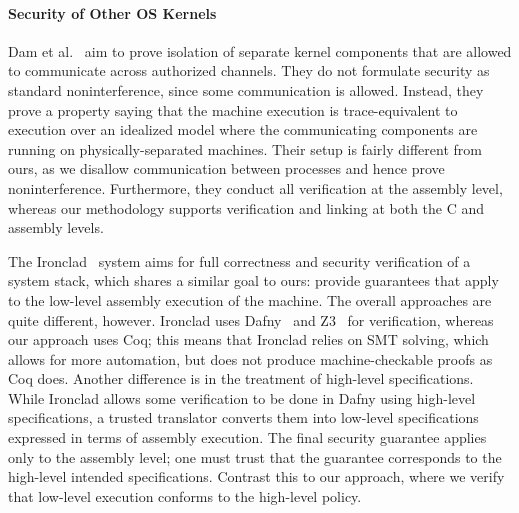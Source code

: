 
%

\paragraph{Security of Other OS Kernels} Dam et al.~\cite{prosper-arm} aim to 
prove isolation of separate kernel components that are allowed to communicate
across authorized channels. They do not formulate security as standard
noninterference, since some communication is allowed. Instead, they
prove a property saying that the machine execution is trace-equivalent
to execution over an idealized model where the communicating
components are running on physically-separated machines. Their setup
is fairly different from ours, as we disallow communication between
processes and hence prove noninterference. Furthermore, they conduct
all verification at the assembly level, whereas our methodology
supports verification and linking at both the C and assembly levels.

The Ironclad~\cite{ironclad} system aims for full correctness and
security verification of a system stack, which shares a similar
goal to ours: provide guarantees that apply to the low-level assembly
execution of the machine. The overall approaches are quite different,
however. Ironclad uses Dafny~\cite{dafny} and Z3~\cite{z3} for
verification, whereas our approach uses Coq; this means that Ironclad
relies on SMT solving, which allows for more automation, but does not
produce machine-checkable proofs as Coq does. 
Another difference is in the treatment
of high-level specifications. While Ironclad allows some verification
to be done in Dafny using high-level specifications, a trusted
translator converts them into low-level specifications expressed in
terms of assembly execution. The final security guarantee applies only
to the assembly level; one must trust that the guarantee corresponds
to the high-level intended specifications. Contrast this to our
approach, where we verify that low-level execution conforms to the
high-level policy.

